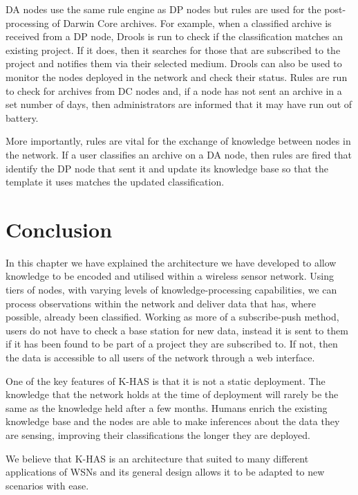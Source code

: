 		DA nodes use the same rule engine as DP nodes but rules are used for the post-processing of Darwin Core archives. For example, when a classified archive is received from a DP node, Drools is run to check if the classification matches an existing project. If it does, then it searches for those that are subscribed to the project and notifies them via their selected medium. Drools can also be used to monitor the nodes deployed in the network and check their status. Rules are run to check for archives from DC nodes and, if a node has not sent an archive in a set number of days, then administrators are informed that it may have run out of battery.
		
		More importantly, rules are vital for the exchange of knowledge between nodes in the network. If a user classifies an archive on a DA node, then rules are fired that identify the DP node that sent it and update its knowledge base so that the template it uses matches the updated classification.
		
	\section{Conclusion}
		In this chapter we have explained the architecture we have developed to allow knowledge to be encoded and utilised within a wireless sensor network. Using tiers of nodes, with varying levels of knowledge-processing capabilities, we can process observations within the network and deliver data that has, where possible, already been classified. Working as more of a subscribe-push method, users do not have to check a base station for new data, instead it is sent to them if it has been found to be part of a project they are subscribed to. If not, then the data is accessible to all users of the network through a web interface.
		
		One of the key features of K-HAS is that it is not a static deployment. The knowledge that the network holds at the time of deployment will rarely be the same as the knowledge held after a few months. Humans enrich the existing knowledge base and the nodes are able to make inferences about the data they are sensing, improving their classifications the longer they are deployed.
		
		We believe that K-HAS is an architecture that suited to many different applications of WSNs and its general design allows it to be adapted to new scenarios with ease.
		
			
			
			
			
			
			
			
			